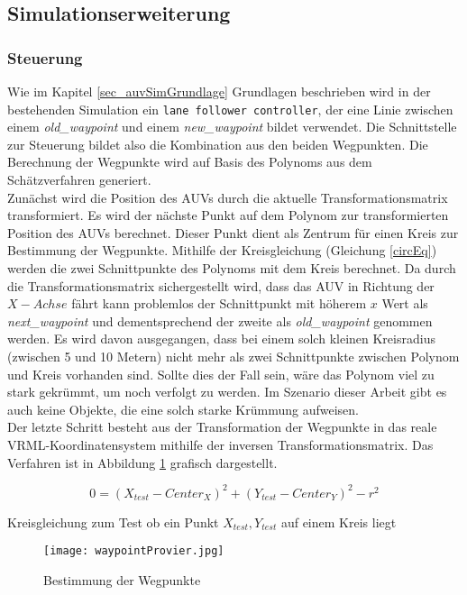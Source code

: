 \subsection{Simulationserweiterung}
\subsubsection{Steuerung}
Wie im Kapitel \ref{sec_auvSimGrundlage} Grundlagen beschrieben wird in der bestehenden Simulation ein \texttt{lane follower controller}, der eine Linie zwischen einem \textit{old\_waypoint} und einem \textit{new\_waypoint} bildet verwendet.
Die Schnittstelle zur Steuerung bildet also die Kombination aus den beiden Wegpunkten. Die Berechnung der Wegpunkte wird auf Basis des Polynoms aus dem Schätzverfahren generiert.\\
Zunächst wird die Position des AUVs durch die aktuelle Transformationsmatrix transformiert. Es wird der nächste Punkt auf dem Polynom zur transformierten Position des AUVs berechnet. Dieser Punkt dient als Zentrum für einen Kreis zur Bestimmung der Wegpunkte. Mithilfe der Kreisgleichung (Gleichung \ref{circEq}) werden die zwei Schnittpunkte des Polynoms mit dem Kreis berechnet. Da durch die Transformationsmatrix sichergestellt wird, dass das AUV in Richtung der $X-Achse$ fährt kann problemlos der Schnittpunkt mit höherem $x$ Wert als \textit{next\_waypoint} und dementsprechend der zweite als \textit{old\_waypoint} genommen werden. Es wird davon ausgegangen, dass bei einem solch kleinen Kreisradius (zwischen 5 und 10 Metern) nicht mehr als zwei Schnittpunkte zwischen Polynom und Kreis vorhanden sind. Sollte dies der Fall sein, wäre das Polynom viel zu stark gekrümmt, um noch verfolgt zu werden. Im Szenario dieser Arbeit gibt es auch keine Objekte, die eine solch starke Krümmung aufweisen.\\
Der letzte Schritt besteht aus der Transformation der Wegpunkte in das reale VRML-Koordinatensystem mithilfe der inversen Transformationsmatrix.
Das Verfahren ist in Abbildung \ref{wpCircle} grafisch dargestellt.

\begin{ownequation}[H]
\begin{equation}
0 = (X_{test}-Center_X)^2+(Y_{test}-Center_Y)^2 - r^2
\end{equation}
\caption{Kreisgleichung zum Test ob ein Punkt $X_{test},Y_{test}$ auf einem Kreis liegt}
\label{circEq}
\end{ownequation}

\begin{figure}[H]
\centering
\texttt{[image: waypointProvier.jpg]}
\caption{Bestimmung der Wegpunkte}
\label{wpCircle}
\end{figure}
